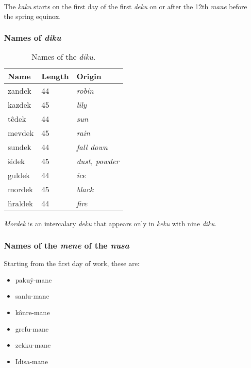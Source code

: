 \documentclass{book}
\begin{document}
The \emph{kaku} starts on the first day of the first \emph{deku} on or after the 12th \emph{mane} before the spring equinox.

\newpage
\subsubsection{Names of \emph{diku}}

\begin{table}[h]
    \caption{Names of the \emph{diku}.}
    \centering
    \begin{tabu} to \linewidth {|l|l|X|}
        \hline
        Name & Length & Origin \\
        \hline
        zandek & 44 &  \emph{robin} \\
        kazdek & 45 &  \emph{lily} \\
        têdek & 44 &  \emph{sun} \\
        mevdek & 45 &  \emph{rain} \\
        sundek & 44 &  \emph{fall down} \\
        ṡidek & 45 &  \emph{dust, powder} \\
        guldek & 44 &  \emph{ice} \\
        mordek & 45 &  \emph{black} \\
        ḣraldek & 44 &  \emph{fire} \\
        \hline
    \end{tabu}
\end{table}

\emph{Mordek} is an intercalary \emph{deku} that appears only in \emph{keku} with nine \emph{diku}.

\subsubsection{Names of the \emph{mene} of the \emph{nusa}}

Starting from the first day of work, these are:

\begin{itemize}
    \item pakuẏ-mane
    \item sanlu-mane
    \item kônre-mane
    \item grefu-mane
    \item zekku-mane
    \item Idisa-mane
\end{itemize}
\end{document}
